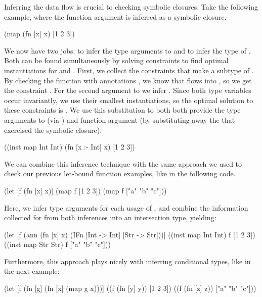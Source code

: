 Inferring the data flow is crucial to checking symbolic closures.
Take the following example, where the function argument is inferred
as a symbolic closure.

\begin{cljlisting}
(map (fn [x] x) [1 2 3])
\end{cljlisting}

We now have two jobs: to infer the type arguments to 
and to infer the type of .
Both can be found simultaneously by solving constraints
to find optimal instantiations for  and .
First, we collect the constraints that make
a subtype of
\clj{[a -> b]}.
By checking the function with annotations
,
we know that  flows into , so
we get the constraint
.
For the second argument to 
we infer
.
Since both type variables occur invariantly, we use their smallest instantiations,
so the optimal solution to these constraints
is .
We use this substitution to both
both provide the type arguments to  (via )
and function argument (by substituting away the  that
exercised the symbolic closure).


\begin{cljlisting}
((inst map Int Int) (fn [x :- Int] x) [1 2 3])
\end{cljlisting}

We can combine this inference technique with the same approach
we used to check our previous let-bound function examples,
like in the following code.

\begin{cljlisting}
(let [f (fn [x] x)]
  (map f [1 2 3])
  (map f ["a" "b" "c"]))
\end{cljlisting}

Here, we infer type arguments for each usage of ,
and combine the information collected for  from both
inferences into an intersection type, yielding:

\begin{cljlisting}
(let [f (ann (fn [x] x)
             (IFn [Int -> Int]
                  [Str -> Str]))]
  ((inst map Int Int) f [1 2 3])
  ((inst map Str Str) f ["a" "b" "c"]))
\end{cljlisting}

Furthermore, this approach plays nicely with inferring conditional types,
like in the next example:

\begin{cljlisting}
(let [f (fn [g]
          (fn [x]
            (map g x)))]
  ((f (fn [y] y)) [1 2 3])
  ((f (fn [z] z)) ["a" "b" "c"]))
\end{cljlisting}

